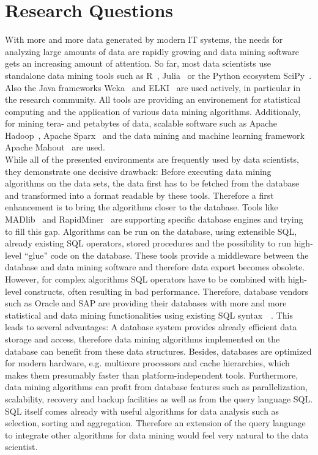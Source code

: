\section{Research Questions}
With more and more data generated by modern IT systems, the needs for analyzing large amounts of data are rapidly growing and data mining software gets an increasing amount of attention. So far, most data scientists use standalone data mining tools such as R~\parencite{R}, Julia~\parencite{Julia} or the Python ecosystem SciPy~\parencite{SciPy}. Also the Java frameworks Weka~\parencite{Weka} and ELKI~\parencite{Elki} are used actively, in particular in the research community. All tools are providing an environement for statistical computing and the application of various data mining algorithms. Additionaly, for mining tera- and petabytes of data, scalable software such as Apache Hadoop~\parencite{hadoop}, Apache Sparx~\parencite{sparx} and the data mining and machine learning framework Apache Mahout~\parencite{mahout} are used.
\\
While all of the presented environments are frequently used by data scientists, they demonstrate one decisive drawback: Before executing data mining algorithms on the data sets, the data first has to be fetched from the database and transformed into a format readable by these tools. Therefore a first enhancement is to bring the algorithms closer to the database. Tools like MADlib~\parencite{MADlib} and RapidMiner~\parencite{RapidMiner} are supporting specific database engines and trying to fill this gap. Algorithms can be run on the database, using extensible SQL, already existing SQL operators, stored procedures and the possibility to run high-level \enquote{glue} code on the database. These tools provide a middleware between the database and data mining software and therefore data export becomes obsolete. 
\\
However, for complex algorithms SQL operators have to be combined with high-level constructs, often resulting in bad performance. Therefore, database vendors such as Oracle and SAP are providing their databases with more and more statistical and data mining functionalities using existing SQL syntax~\parencite{oracle}~\parencite{SAP}. This leads to several advantages: A database system provides already efficient data storage and access, therefore data mining algorithms implemented on the database can benefit from these data structures. Besides, databases are optimized for modern hardware, e.g. multicore processors and cache hierarchies, which makes them presumably faster than platform-independent tools. Furthermore, data mining algorithms can profit from database features such as parallelization, scalability, recovery and backup facilities as well as from the query language SQL. SQL itself comes already with useful algorithms for data analysis such as selection, sorting and aggregation. Therefore an extension of the query language to integrate other algorithms for data mining would feel very natural to the data scientist. 
